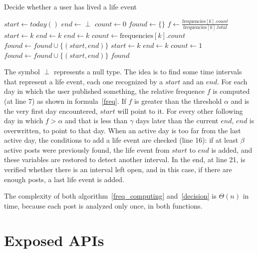\begin{algorithm}
\caption{Decide whether a user has lived a life event}
\label{decision}
\begin{algorithmic}[1]
\State $start \gets today()$
\State $end \gets \perp$
\State $count \gets 0$
\State $found \gets \{\}$
	\State $f \gets \frac{\text{frequencies}[k].count}{\text{frequencies}[k].total}$
			\State $start \gets k$
			\State $end \gets k$
		\EndIf
			\State $end \gets k$
			\State $count \gets \text{frequencies}[k].count$
		\Else
				\State $found \gets found \cup \{(start, end)\}$
			\EndIf
			\State $start \gets k$
			\State $end \gets k$
			\State $count \gets 1$
		\EndIf
	\EndIf
\EndFor
{}
	\State $found \gets found \cup \{(start, end)\}$
\EndIf
\Return $found$
\EndFunction
\end{algorithmic}
\end{algorithm}

The symbol $\perp$ represents a null type. The idea is to find some time intervals that represent a life event, each one recognized by a $start$ and an $end$. For each day in which the user published something, the relative frequence $f$ is computed (at line 7) as shown in formula~\ref{freq}. If $f$ is greater than the threshold $\alpha$ and is the very first day encountered, $start$ will point to it. For every other following day in which $f > \alpha$ and that is less than $\gamma$ days later than the current $end$, $end$ is overwritten, to point to that day. When an active day is too far from the last active day, the conditions to add a life event are checked (line 16): if at least $\beta$ active posts were previously found, the life event from $start$ to $end$ is added, and these variables are restored to detect another interval. In the end, at line 21, is verified whether there is an interval left open, and in this case, if there are enough posts, a last life event is added.

The complexity of both algorithm~\ref{freq_computing} and~\ref{decision} is $\Theta(n)$ in time, because each post is analyzed only once, in both functions. 

\section{Exposed APIs}
\label{sec:APIs}

